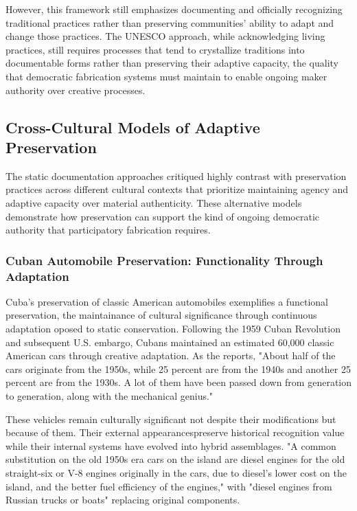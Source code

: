 \vspace{0.5cm}

However, this framework still emphasizes documenting and officially recognizing traditional practices rather than preserving communities' ability to adapt and change those practices. The UNESCO approach, while acknowledging living practices, still requires processes that tend to crystallize traditions into documentable forms rather than preserving their adaptive capacity, the quality that democratic fabrication systems must maintain to enable ongoing maker authority over creative processes.

\subsection{Cross-Cultural Models of Adaptive Preservation}

The static documentation approaches critiqued highly contrast with preservation practices across different cultural contexts that prioritize maintaining agency and adaptive capacity over material authenticity. These alternative models demonstrate how preservation can support the kind of ongoing democratic authority that participatory fabrication requires.

\subsubsection{Cuban Automobile Preservation: Functionality Through Adaptation}

Cuba's preservation of classic American automobiles exemplifies a functional preservation, the maintainance of cultural significance through continuous adaptation oposed to static conservation. Following the 1959 Cuban Revolution and subsequent U.S. embargo, Cubans maintained an estimated 60,000 classic American cars through creative adaptation. As the \citet{diplomatictimes2019} reports, "About half of the cars originate from the 1950s, while 25 percent are from the 1940s and another 25 percent are from the 1930s. A lot of them have been passed down from generation to generation, along with the mechanical genius."

\vspace{0.5cm}

These vehicles remain culturally significant not despite their modifications but because of them. Their external appearancespreserve historical recognition value while their internal systems have evolved into hybrid assemblages. "A common substitution on the old 1950s era cars on the island are diesel engines for the old straight-six or V-8 engines originally in the cars, due to diesel's lower cost on the island, and the better fuel efficiency of the engines," \citep{diplomatictimes2019} with "diesel engines from Russian trucks or boats" \citep{diplomatictimes2019} replacing original components.

